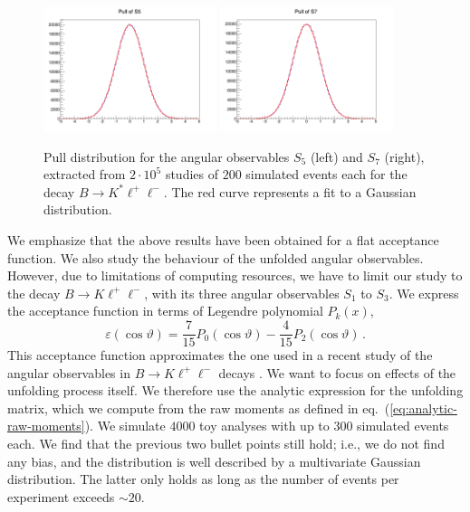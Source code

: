 \documentclass[aps,prd,reprint,nofootinbib,preprintnumbers]{revtex4}
\newcommand{\refeq}[1]{eq.~(\ref{eq:#1})}
\renewcommand{\theta}{\vartheta}
\let\eps\varepsilon
\newcommand{\add}[1]{\textcolor{green!85!black}{#1}}
\begin{document}
\begin{figure}[b]
        \centering
            \includegraphics[width=0.45\textwidth]{figs/pull-Q2_5_6_S5_200.png}
            \includegraphics[width=0.45\textwidth]{figs/pull-Q2_5_6_S7_200.png}
        \caption{Pull distribution for the angular observables $S_5$ (left) and $S_7$ (right), extracted from $2\cdot 10^5$ studies of
        $200$ simulated events each for the decay $B\to K^*\ell^+\ell^-$. The red curve represents a fit to a Gaussian distribution.}
        \label{fig:pulls}
\end{figure}

\add{We emphasize that the above results have been obtained for a flat acceptance function.
We also study the behaviour of the unfolded angular observables. However, due to limitations of computing
resources, we have to limit our study to the decay $B\to K\ell^+\ell^-$, with its three angular observables
$S_1$ to $S_3$. We express the acceptance function in terms of Legendre polynomial $P_k(x)$,
\begin{equation}
    \eps(\cos\theta) = \frac{7}{15} P_0(\cos\theta) - \frac{4}{15} P_2(\cos\theta)\,.
\end{equation}
This acceptance function approximates the one used in a recent study of the angular observables in $B\to K\ell^+\ell^-$
decays \cite{Aaij:2014tfa}. We want to focus on effects of the unfolding process itself. We therefore
use the analytic expression for the unfolding matrix, which we compute from the raw moments as
defined in \refeq{analytic-raw-moments}. We simulate $4000$ toy analyses with up to $300$ simulated events each.
We find that the previous two bullet points still hold; i.e., we do not find any bias, and the distribution
is well described by a multivariate Gaussian distribution. The latter only holds as long as the number of events
per experiment exceeds $\sim 20$.
}
\end{document}
